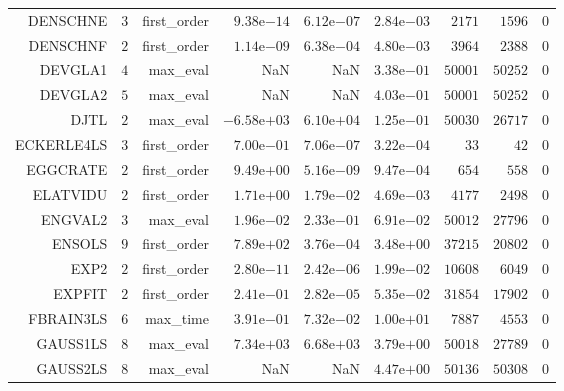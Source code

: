 \begin{longtable}{rrrrrrrrr}
DENSCHNE & \(     3\) & first\_order & \( 9.38\)e\(-14\) & \( 6.12\)e\(-07\) & \( 2.84\)e\(-03\) & \(  2171\) & \(  1596\) & \(     0\) \\
DENSCHNF & \(     2\) & first\_order & \( 1.14\)e\(-09\) & \( 6.38\)e\(-04\) & \( 4.80\)e\(-03\) & \(  3964\) & \(  2388\) & \(     0\) \\
DEVGLA1 & \(     4\) & max\_eval &       NaN &       NaN & \( 3.38\)e\(-01\) & \( 50001\) & \( 50252\) & \(     0\) \\
DEVGLA2 & \(     5\) & max\_eval &       NaN &       NaN & \( 4.03\)e\(-01\) & \( 50001\) & \( 50252\) & \(     0\) \\
DJTL & \(     2\) & max\_eval & \(-6.58\)e\(+03\) & \( 6.10\)e\(+04\) & \( 1.25\)e\(-01\) & \( 50030\) & \( 26717\) & \(     0\) \\
ECKERLE4LS & \(     3\) & first\_order & \( 7.00\)e\(-01\) & \( 7.06\)e\(-07\) & \( 3.22\)e\(-04\) & \(    33\) & \(    42\) & \(     0\) \\
EGGCRATE & \(     2\) & first\_order & \( 9.49\)e\(+00\) & \( 5.16\)e\(-09\) & \( 9.47\)e\(-04\) & \(   654\) & \(   558\) & \(     0\) \\
ELATVIDU & \(     2\) & first\_order & \( 1.71\)e\(+00\) & \( 1.79\)e\(-02\) & \( 4.69\)e\(-03\) & \(  4177\) & \(  2498\) & \(     0\) \\
ENGVAL2 & \(     3\) & max\_eval & \( 1.96\)e\(-02\) & \( 2.33\)e\(-01\) & \( 6.91\)e\(-02\) & \( 50012\) & \( 27796\) & \(     0\) \\
ENSOLS & \(     9\) & first\_order & \( 7.89\)e\(+02\) & \( 3.76\)e\(-04\) & \( 3.48\)e\(+00\) & \( 37215\) & \( 20802\) & \(     0\) \\
EXP2 & \(     2\) & first\_order & \( 2.80\)e\(-11\) & \( 2.42\)e\(-06\) & \( 1.99\)e\(-02\) & \( 10608\) & \(  6049\) & \(     0\) \\
EXPFIT & \(     2\) & first\_order & \( 2.41\)e\(-01\) & \( 2.82\)e\(-05\) & \( 5.35\)e\(-02\) & \( 31854\) & \( 17902\) & \(     0\) \\
FBRAIN3LS & \(     6\) & max\_time & \( 3.91\)e\(-01\) & \( 7.32\)e\(-02\) & \( 1.00\)e\(+01\) & \(  7887\) & \(  4553\) & \(     0\) \\
GAUSS1LS & \(     8\) & max\_eval & \( 7.34\)e\(+03\) & \( 6.68\)e\(+03\) & \( 3.79\)e\(+00\) & \( 50018\) & \( 27789\) & \(     0\) \\
GAUSS2LS & \(     8\) & max\_eval &       NaN &       NaN & \( 4.47\)e\(+00\) & \( 50136\) & \( 50308\) & \(     0\) \\

\end{longtable}

